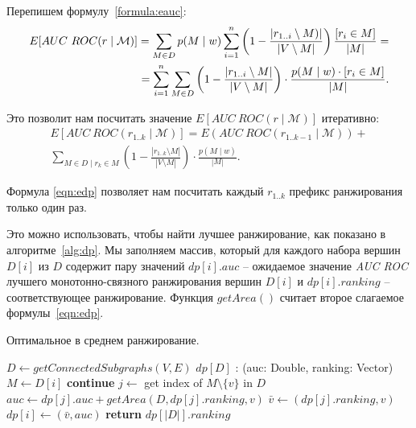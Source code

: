 Перепишем формулу~\ref{formula:eauc}:
\begin{align}
    E[AUC~ROC(r \mid \mathcal{M})] = \sum_{M \in D} p(M \mid w) \sum_{i=1}^n \left(
    1 - \frac{|r_{1..i} \setminus M)|}{|V \setminus M|}\right) \frac{[r_i \in
      M]}{|M|} = \notag\\
    =  \sum_{i=1}^n \sum_{M \in D}  \left(
    1 - \frac{|r_{1..i}\setminus M|}{|V \setminus M|}\right) \cdot \frac{p(M \mid w)
      \cdot [r_i \in M]}{|M|}.
\end{align}

Это позволит нам посчитать значение $E[AUC~ROC(r \mid \mathcal{M})]$ итеративно:
\begin{multline} \label{eqn:edp}
    E[AUC~ROC(r_{1..k} \mid \mathcal{M})] = E(AUC~ROC(r_{1..k-1} \mid
    \mathcal{M})) + \\ \sum_{M \in D \mid r_k \in M} \left( 1 - \frac{|r_{1..k}
    \setminus M|}{|V \setminus M|}\right) \cdot \frac{p(M \mid w)}{|M|}. 
\end{multline}

Формула \eqref{eqn:edp} позволяет нам посчитать каждый $r_{1..k}$ префикс
ранжирования только один раз.

Это можно использовать, чтобы найти лучшее ранжирование, как показано
в алгоритме~\ref{alg:dp}.  Мы заполняем массив, который для каждого набора
вершин $D[i]$ из $D$ содержит пару значений $dp[i].auc$ -- ожидаемое значение
\emph{AUC ROC} лучшего монотонно-связного ранжирования вершин $D[i]$ и $dp[i].ranking$
-- соответствующее ранжирование. Функция $getArea()$ считает второе слагаемое
формулы~\eqref{eqn:edp}.

\begin{algorithm}
    \caption{Оптимальное в среднем ранжирование.}\label{alg:dp}
    \begin{algorithmic}[1]
        \State $D \gets getConnectedSubgraphs(V, E)$  
        \State $dp[D]$ : (auc: Double, ranking: Vector)
            \State $M \gets D[i]$
                    \State \textbf{continue}
                \EndIf
                \State $j \gets$  get index of $M \setminus \{v\}$ in $D$
                \State $auc \gets dp[j].auc + getArea(D, dp[j].ranking, v)$
                    \State $\bar{v} \gets (dp[j].ranking, v)$
                    \State $dp[i] \gets (\bar{v}, auc)$
                \EndIf
            \EndFor
        \EndFor
        \State \textbf{return} $dp[|D|].ranking$
        \EndProcedure
    \end{algorithmic}
\end{algorithm}

